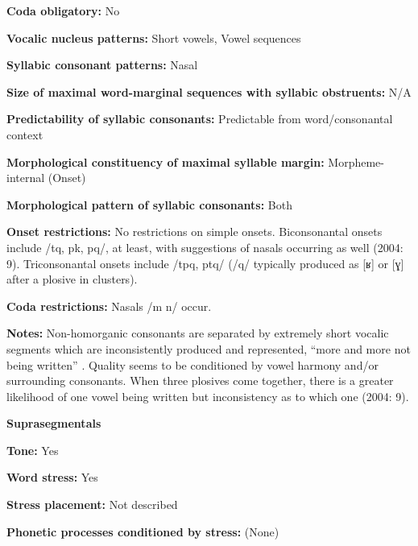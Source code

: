 \textbf{Coda obligatory:} No



\textbf{Vocalic nucleus patterns:} Short vowels, Vowel sequences



\textbf{Syllabic consonant patterns:} Nasal



\textbf{Size of maximal word{}-marginal sequences with syllabic obstruents:} N/A



\textbf{Predictability of syllabic consonants:} Predictable from word/consonantal context



\textbf{Morphological constituency of maximal syllable margin:} Morpheme-internal (Onset)



\textbf{Morphological pattern of syllabic consonants:} Both



\textbf{Onset restrictions:} No restrictions on simple onsets. Biconsonantal onsets include /tq, pk, pq/, at least, with suggestions of nasals occurring as well (2004: 9). Triconsonantal onsets include /tpq, ptq/ (/q/ typically produced as [ʁ] or [ɣ] after a plosive in clusters). 



\textbf{Coda restrictions:} Nasals /m n/ occur.



\textbf{Notes:} Non-homorganic consonants are separated by extremely short vocalic segments which are inconsistently produced and represented, “more and more not being written” \citep[226]{Whitehead2004}. Quality seems to be conditioned by vowel harmony and/or surrounding consonants. When three plosives come together, there is a greater likelihood of one vowel being written but inconsistency as to which one (2004: 9).



\textbf{Suprasegmentals}



\textbf{Tone:} Yes



\textbf{Word stress:} Yes



\textbf{Stress placement:} Not described



\textbf{Phonetic processes conditioned by stress:} (None)



